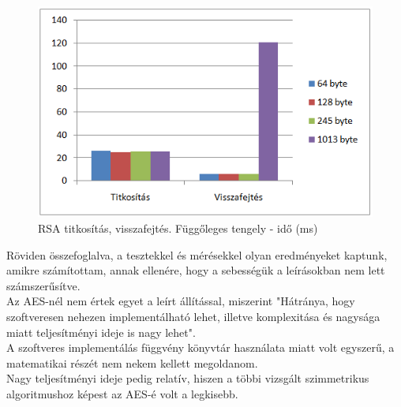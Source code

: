 \begin{figure}[h]
	\centering
	\includegraphics[scale=0.8]{images/alg_graf_4.png}
	\caption{RSA titkosítás, visszafejtés. Függőleges tengely - idő (ms)}
	\label{fig:rsa_graf}
\end{figure}


\noindent Röviden összefoglalva, a tesztekkel és mérésekkel olyan eredményeket kaptunk, amikre számítottam, annak ellenére, hogy a sebességük a leírásokban nem lett számszerűsítve. 
\\Az AES-nél nem értek egyet a leírt állítással, miszerint "Hátránya, hogy szoftveresen nehezen implementálható lehet, illetve komplexitása és nagysága miatt teljesítményi ideje is nagy lehet".
\\A szoftveres implementálás függvény könyvtár használata miatt volt egyszerű, a matematikai részét nem nekem kellett megoldanom.
\\Nagy teljesítményi ideje pedig relatív, hiszen a többi vizsgált szimmetrikus algoritmushoz képest az AES-é volt a legkisebb.